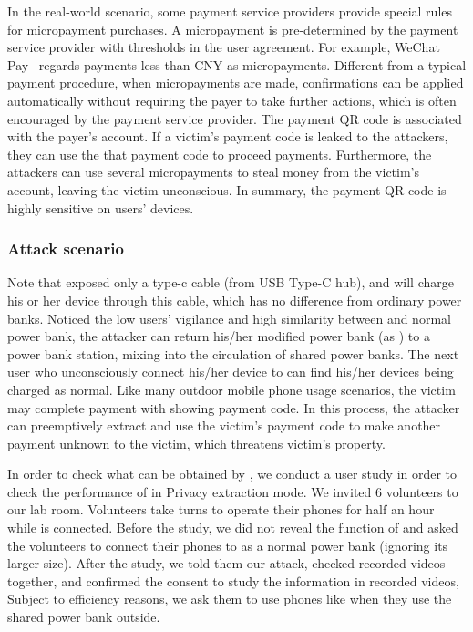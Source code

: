 In the real-world scenario, some payment service providers provide special rules for micropayment purchases. 
A micropayment is pre-determined by the payment service provider with thresholds in the user agreement. 
For example, WeChat Pay~\cite{Wechat-pay} regards payments less than CNY  as micropayments. 
Different from a typical payment procedure, when micropayments are made, confirmations can be applied automatically without requiring the payer to take further actions, which is often encouraged by the payment service provider.
The payment QR code is associated with the payer's account. 
If a victim's payment code is leaked to the attackers, they can use the that payment code to proceed payments. 
Furthermore, the attackers can use several micropayments to steal money from the victim's account, leaving the victim unconscious. 
In summary, the payment QR code is highly sensitive on users' devices.

\subsubsection{Attack scenario}

Note that \tool exposed only a type-c cable (from USB Type-C hub),
and \tool will charge his or her device through this cable, which has no difference from ordinary power banks. Noticed the low users' vigilance and high similarity between \tool and normal power bank, the attacker can return his/her modified power bank (as \tool) to a power bank station, mixing \tool into the circulation of shared power banks. The next user who unconsciously connect his/her device to \tool can find his/her devices being charged as normal.
Like many outdoor mobile phone usage scenarios, the victim may complete payment with showing payment code. In this process, the attacker can preemptively extract and use the victim's payment code to make another payment unknown to the victim, which threatens victim's property.


In order to check what can be obtained by \tool, we conduct a user study in order to check the performance of \tool in Privacy extraction mode. We invited 6 volunteers to our lab room. Volunteers take turns to operate their phones for half an hour while \tool is connected. Before the study, we did not reveal the function of \tool and asked the volunteers to connect their phones to \tool as a normal power bank (ignoring its larger size). 
After the study, we told them our attack, checked recorded videos together, and confirmed the consent to study the information in recorded videos, Subject to efficiency reasons, we ask them to use phones like when they use the shared power bank outside.



